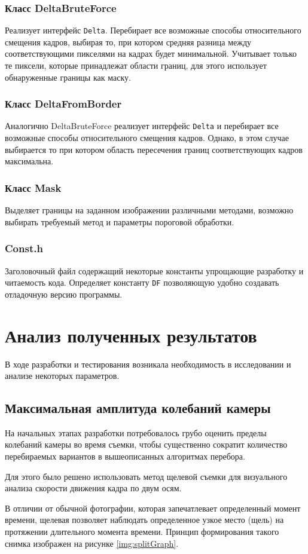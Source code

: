 \subsubsection{Класс DeltaBruteForce~}
Реализует интерфейс \texttt{Delta}. Перебирает все возможные способы относительного смещения кадров, выбирая то, при котором средняя разница между соответствующими пикселями на кадрах будет минимальной. Учитывает только те пиксели, которые принадлежат области границ, для этого использует обнаруженные границы как маску.
\subsubsection{Класс DeltaFromBorder~}
Аналогично DeltaBruteForce реализует интерфейс \texttt{Delta} и перебирает все возможные способы относительного смещения кадров. Однако,  в этом случае выбирается то при котором область пересечения границ соответствующих кадров максимальна.
\subsubsection{Класс Mask~}
Выделяет границы на заданном изображении различными методами, возможно выбирать требуемый метод и параметры пороговой обработки.
\subsubsection{Const.h~}
Заголовочный файл содержащий некоторые константы упрощающие разработку и читаемость кода. Определяет константу \texttt{DF} позволяющую удобно создавать отладочную версию программы.
\section{Анализ полученных результатов}
В ходе разработки и тестирования возникала необходимость в исследовании и анализе некоторых параметров. 
\subsection{Максимальная амплитуда колебаний камеры}
На начальных этапах разработки потребовалось грубо оценить пределы колебаний камеры во время съемки, чтобы существенно сократит количество перебираемых вариантов в вышеописанных алгоритмах перебора.

Для этого было решено использовать метод щелевой съемки для визуального анализа скорости движения кадра по двум осям.

В отличии от обычной фотографии, которая запечатлевает определенный момент времени, щелевая позволяет наблюдать определенное узкое место (щель) на протяжении длительного момента времени. Принцип  формирования такого снимка изображен на рисунке \ref{img:splitGraph}.

